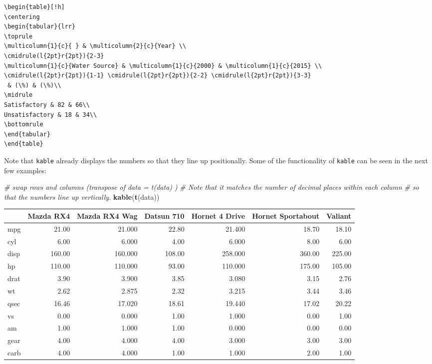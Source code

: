 \documentclass[]{article}
\newenvironment{Shaded}{\begin{snugshade}}{\end{snugshade}}
\newcommand{\KeywordTok}[1]{\textcolor[rgb]{0.13,0.29,0.53}{\textbf{#1}}}
\newcommand{\CommentTok}[1]{\textcolor[rgb]{0.56,0.35,0.01}{\textit{#1}}}
\newcommand{\NormalTok}[1]{#1}
\begin{document}
\begin{verbatim}
\begin{table}[!h]
\centering
\begin{tabular}{lrr}
\toprule
\multicolumn{1}{c}{ } & \multicolumn{2}{c}{Year} \\
\cmidrule(l{2pt}r{2pt}){2-3}
\multicolumn{1}{c}{Water Source} & \multicolumn{1}{c}{2000} & \multicolumn{1}{c}{2015} \\
\cmidrule(l{2pt}r{2pt}){1-1} \cmidrule(l{2pt}r{2pt}){2-2} \cmidrule(l{2pt}r{2pt}){3-3}
 & (\%) & (\%)\\
\midrule
Satisfactory & 82 & 66\\
Unsatisfactory & 18 & 34\\
\bottomrule
\end{tabular}
\end{table}
\end{verbatim}

Note that \texttt{kable} already displays the numbers so that they line
up positionally. Some of the functionality of \texttt{kable} can be seen
in the next few examples:

\begin{Shaded}
\begin{Highlighting}[]
\CommentTok{# swap rows and columns (transpose of data = t(data) )}
\CommentTok{# Note that it matches the number of decimal places within each column }
\CommentTok{# so that the numbers line up vertically.}
\KeywordTok{kable}\NormalTok{(}\KeywordTok{t}\NormalTok{(data))  }
\end{Highlighting}
\end{Shaded}

\begin{longtable}[]{@{}lrrrrrr@{}}
\toprule
& Mazda RX4 & Mazda RX4 Wag & Datsun 710 & Hornet 4 Drive & Hornet
Sportabout & Valiant\tabularnewline
\midrule
\endhead
mpg & 21.00 & 21.000 & 22.80 & 21.400 & 18.70 & 18.10\tabularnewline
cyl & 6.00 & 6.000 & 4.00 & 6.000 & 8.00 & 6.00\tabularnewline
disp & 160.00 & 160.000 & 108.00 & 258.000 & 360.00 &
225.00\tabularnewline
hp & 110.00 & 110.000 & 93.00 & 110.000 & 175.00 & 105.00\tabularnewline
drat & 3.90 & 3.900 & 3.85 & 3.080 & 3.15 & 2.76\tabularnewline
wt & 2.62 & 2.875 & 2.32 & 3.215 & 3.44 & 3.46\tabularnewline
qsec & 16.46 & 17.020 & 18.61 & 19.440 & 17.02 & 20.22\tabularnewline
vs & 0.00 & 0.000 & 1.00 & 1.000 & 0.00 & 1.00\tabularnewline
am & 1.00 & 1.000 & 1.00 & 0.000 & 0.00 & 0.00\tabularnewline
gear & 4.00 & 4.000 & 4.00 & 3.000 & 3.00 & 3.00\tabularnewline
carb & 4.00 & 4.000 & 1.00 & 1.000 & 2.00 & 1.00\tabularnewline
\bottomrule
\end{longtable}
\end{document}
